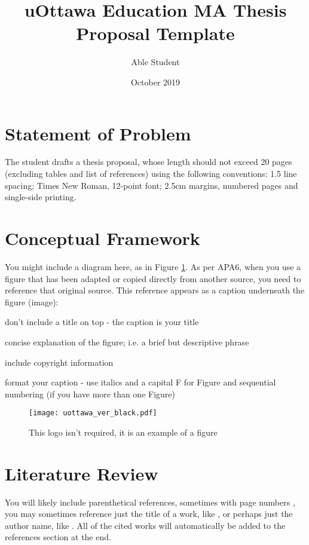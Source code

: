 \documentclass[
doc, 
biblatex,
12pt
]{apa6}
\title{uOttawa Education MA Thesis Proposal Template}
\author{Able Student}
\date{October 2019}
\affiliation{University of Ottawa}
\begin{document}
\maketitle

\section{Statement of Problem}
The student drafts a thesis proposal, whose length should not exceed 20 pages (excluding tables and list of references) using the following conventions: 1.5 line spacing; Times New Roman, 12-point font; 2.5cm margins, numbered pages and single-side printing.

\lipsum[1]

\section{Conceptual Framework}
You might include a diagram here, as in Figure \ref{fig:logo}. As per APA6, when you use a figure that has been adapted or copied directly from another source, you need to reference that original source. This reference appears as a caption underneath the figure (image):

\begin{APAitemize}
\item don't include a title on top - the caption is your title
\item concise explanation of the figure; i.e. a brief but descriptive phrase
\item include copyright information
\item format your caption - use italics and a capital F for Figure and sequential numbering (if you have more than one Figure)
\end{APAitemize}

\begin{figure}[!ht]
\centering
\texttt{[image: uottawa\_ver\_black.pdf]}
\caption{This logo isn't required, it is an example of a figure}
\label{fig:logo}
\end{figure}

\section{Literature Review}
You will likely include parenthetical references, sometimes with page numbers \parencite[p.\,12-14]{writer2109Best}, you may sometimes reference just the title of a work, like , or perhaps just the author name, like  \citeauthor{writer2109Best}. All of the cited works will automatically be added to the references section at the end.
\end{document}
